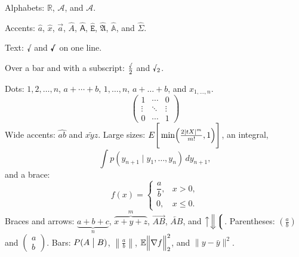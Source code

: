 \documentclass{article}
\begin{document}
Alphabets: $\mathbb{R}$, $\mathcal{A}$, and $\boldsymbol{\mathcal{A}}$.

Accents: $\hat a$, $\hat x$, $\vec a$, $\hat A$, $\hat{\mathsf A}$, $\hat{\mathtt E}$,
$\hat{\mathfrak A}$, $\hat{\mathbb A}$, and $\hat{\boldsymbol{\mathsf{\Sigma}}}$.

Text: $\text{\textsurd}$ and $\text{\textbf{\textsurd}}$ on one line.

Over a bar and with a subscript: $\frac{\text{\textsurd}}{2}$ and $\text{\textsurd}_2$.

Dots: $1,2,\ldots,n$, $a+\cdots+b$, $1,\dots,n$, $a+\dots+b$, and
$x_{1,\ldots,n}$.
\[ \begin{pmatrix} 1 & \cdots & 0 \\ \vdots & \ddots & \vdots \\ 0 & \cdots & 1 \end{pmatrix} \]
Wide accents: $\widehat{ab}$ and $\widetilde{xyz}$.
Large sizes: $E\Bigg[\min\Bigl(\frac{2|tX|^m}{m!},1\Bigr)\Bigg]$, an integral,
\[ \int p(y_{n+1}\mid y_1,\dots,y_n)\,dy_{n+1}, \]
and a brace:
\[ f(x) = \begin{cases} \dfrac{a}{b}, & x > 0, \\ 0, & x \le 0. \end{cases} \]
Braces and arrows: $\underbrace{a+b+c}_{n}$, $\overbrace{x+y+z}^{m}$,
$\overrightarrow{AB}$, $\overleftarrow{AB}$, and $\big\uparrow\Big\Downarrow\Big\lgroup$.
Parentheses: $\left(\frac{a}{b}\right)$ and $\begin{pmatrix} a \\ b \end{pmatrix}$.
Bars: $P(A \bigm| B)$, $\left\| \frac{a}{b} \right\|$,
$\mathbb{E}\Bigl\|\nabla f\Bigr\|_2^2$, and $\lVert y-\bar y\rVert^2$.
\end{document}

